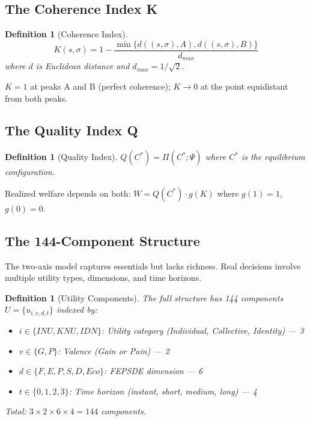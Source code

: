 \documentclass[12pt,a4paper]{article}
\newtheorem{definition}[theorem]{Definition}
\begin{document}
\subsection{The Coherence Index K}

\begin{definition}[Coherence Index]
\begin{equation}
  K(s, \sigma) = 1 - \frac{\min\{d((s,\sigma), A), d((s,\sigma), B)\}}{d_{max}}
  \label{eq:kformal}
\end{equation}
where $d$ is Euclidean distance and $d_{max} = 1/\sqrt{2}$.
\end{definition}

$K = 1$ at peaks A and B (perfect coherence); $K \to 0$ at the point equidistant from both peaks.

\subsection{The Quality Index Q}

\begin{definition}[Quality Index]
$Q(C^*) = \Pi(C^*; \Psi)$ where $C^*$ is the equilibrium configuration.
\end{definition}

Realized welfare depends on both: $W = Q(C^*) \cdot g(K)$ where $g(1) = 1$, $g(0) = 0$.

\subsection{The 144-Component Structure}

The two-axis model captures essentials but lacks richness.
Real decisions involve multiple utility types, dimensions, and time horizons.

\begin{definition}[Utility Components]
The full structure has 144 components $U = \{u_{i,v,d,t}\}$ indexed by:
\begin{itemize}
  \item $i \in \{INU, KNU, IDN\}$: Utility category (Individual, Collective, Identity) --- 3
  \item $v \in \{G, P\}$: Valence (Gain or Pain) --- 2
  \item $d \in \{F, E, P, S, D, Eco\}$: FEPSDE dimension --- 6
  \item $t \in \{0, 1, 2, 3\}$: Time horizon (instant, short, medium, long) --- 4
\end{itemize}
Total: $3 \times 2 \times 6 \times 4 = 144$ components.
\end{definition}
\end{document}
